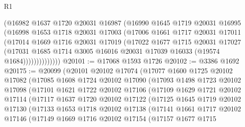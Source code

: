 \begin{lexlean}{R1}
\begin{coremodule}
                (@16982
                  @1637
                  @1720
                  @20031
                  @16987
                  (@16990
                    @1645
                    @1719
                    @20031
                    @16995
                    (@16998
                      @1653
                      @1718
                      @20031
                      @17003
                      (@17006
                        @1661
                        @1717
                        @20031
                        @17011
                        (@17014
                          @1669
                          @1716
                          @20031
                          @17019
                          (@17022
                            @1677
                            @1715
                            @20031
                            @17027
                            (@17031
                              @1685
                              @1714
                              @3005
                              @16016
                              @20031
                              @17039
                              @16033
                              (@19574 @1684))))))))))))))
@20101 := @17068 @1593 @1726
@20102 := @3386 @1692
@20175 := @20099
    (@20101
      @20102
      @17074
      (@17077
        @1600
        @1725
        @20102
        @17082
        (@17085
          @1608
          @1724
          @20102
          @17090
          (@17093
            @1498
            @1723
            @20102
            @17098
            (@17101
              @1621
              @1722
              @20102
              @17106
              (@17109
                @1629
                @1721
                @20102
                @17114
                (@17117
                  @1637
                  @1720
                  @20102
                  @17122
                  (@17125
                    @1645
                    @1719
                    @20102
                    @17130
                    (@17133
                      @1653
                      @1718
                      @20102
                      @17138
                      (@17141
                        @1661
                        @1717
                        @20102
                        @17146
                        (@17149
                          @1669
                          @1716
                          @20102
                          @17154
                          (@17157
                            @1677
                            @1715

\end{coremodule}
\end{lexlean}
